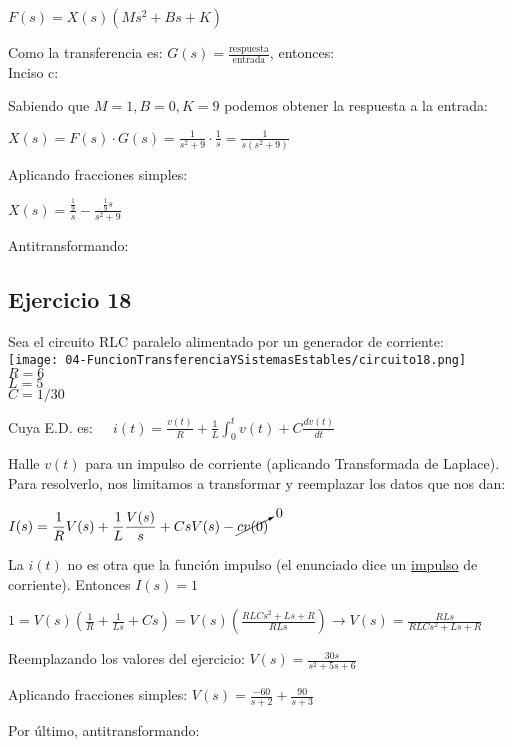 \documentclass[11pt]{article}
\begin{document}
	$\displaystyle F(s)=X(s)(Ms^2+Bs+K)$
	
	Como la transferencia es: $G(s)=\frac{\text{respuesta}}{\text{entrada}}$, entonces: \\
	
	Inciso c:
	
	Sabiendo que $M=1, B=0, K=9$ podemos obtener la respuesta a la entrada:
	
	$\displaystyle X(s)=F(s)\cdot G(s)=\frac{1}{s^2+9}\cdot\frac{1}{s}=\frac{1}{s(s^2+9)}$
	
	Aplicando fracciones simples:
	
	$\displaystyle X(s)=\frac{\frac{1}{9}}{s}-\frac{\frac{1}{9}s}{s^2+9}$
	
	Antitransformando:
	
		
	\subsection{Ejercicio 18}
	Sea el circuito RLC paralelo alimentado por un generador de corriente:\\
	\texttt{[image: 04-FuncionTransferenciaYSistemasEstables/circuito18.png]}\\
	$R=6$\\
	$L=5$\\
	$C=1/30$
	
	Cuya E.D. es: $\displaystyle \;\;\;\; i(t)=\frac{v(t)}{R}+\frac{1}{L}\int_{0}^{t}v(t)+C \frac{dv(t)}{dt}$
	
	Halle $v(t)$ para un impulso de corriente (aplicando Transformada de Laplace). \\
	
	Para resolverlo, nos limitamos a transformar y reemplazar los datos que nos dan:
	
	$\displaystyle I(s)=\frac{1}{R} V(s)+\frac{1}{L}\frac{V(s)}{s}+CsV(s)-\cancelto{0}{cv(0)}$
	
	La $i(t)$ no es otra que la función impulso (el enunciado dice un \underline{impulso} de corriente). Entonces $I(s)=1$
	
	$\displaystyle 1=V(s)\left(\frac{1}{R}+\frac{1}{Ls}+Cs\right)=V(s)\left(\frac{RLCs^2+Ls+R}{RLs}\right)\rightarrow V(s)=\frac{RLs}{RLCs^2+Ls+R}$
	
	Reemplazando los valores del ejercicio: $\displaystyle V(s)=\frac{30s}{s^2+5s+6}$
	
	Aplicando fracciones simples: $\displaystyle V(s)= \frac{-60}{s+2}+\frac{90}{s+3}$
	
	Por último, antitransformando: 
	
	
\end{document}
